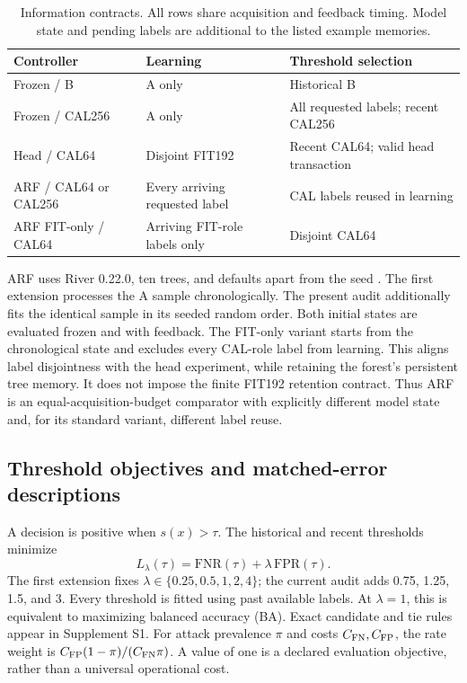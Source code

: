 \begin{table}[tb]
\centering\small
\caption{Information contracts. All rows share acquisition and feedback timing. Model state and pending labels are additional to the listed example memories.}
\label{tab:contracts}
\begin{tabularx}{\linewidth}{lXX}
\toprule
Controller & Learning & Threshold selection \\
\midrule
Frozen / B & A only & Historical B \\
Frozen / CAL256 & A only & All requested labels; recent CAL256 \\
Head / CAL64 & Disjoint FIT192 & Recent CAL64; valid head transaction \\
ARF / CAL64 or CAL256 & Every arriving requested label & CAL labels reused in learning \\
ARF FIT-only / CAL64 & Arriving FIT-role labels only & Disjoint CAL64 \\
\bottomrule
\end{tabularx}
\end{table}

ARF uses River 0.22.0, ten trees, and defaults apart from the seed \citep{riverdocs}. The first extension processes the A sample chronologically. The present audit additionally fits the identical sample in its seeded random order. Both initial states are evaluated frozen and with feedback. The FIT-only variant starts from the chronological state and excludes every CAL-role label from learning. This aligns label disjointness with the head experiment, while retaining the forest's persistent tree memory. It does not impose the finite FIT192 retention contract. Thus ARF is an equal-acquisition-budget comparator with explicitly different model state and, for its standard variant, different label reuse.

\subsection{Threshold objectives and matched-error descriptions}
A decision is positive when $s(x)>\tau$. The historical and recent thresholds minimize
\begin{equation}
 L_\lambda(\tau)=\mathrm{FNR}(\tau)+\lambda\,\mathrm{FPR}(\tau).
 \label{eq:cost}
\end{equation}
The first extension fixes $\lambda\in\{0.25,0.5,1,2,4\}$; the current audit adds 0.75, 1.25, 1.5, and 3. Every threshold is fitted using past available labels. At $\lambda=1$, this is equivalent to maximizing balanced accuracy (BA). Exact candidate and tie rules appear in Supplement S1. For attack prevalence $\pi$ and costs $C_{\rm FN},C_{\rm FP}$, the rate weight is $C_{\rm FP}(1-\pi)/(C_{\rm FN}\pi)$. A value of one is a declared evaluation objective, rather than a universal operational cost.

